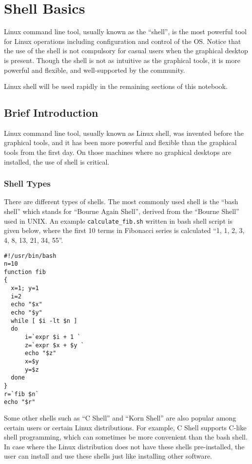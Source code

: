 \chapter{Shell Basics} \label{ch:sb}

Linux command line tool, usually known as the ``shell'', is the most powerful tool for Linux operations including configuration and control of the OS. Notice that the use of the shell is not compulsory for casual users when the graphical desktop is present. Though the shell is not as intuitive as the graphical tools, it is more powerful and flexible, and well-supported by the community.

Linux shell will be used rapidly in the remaining sections of this notebook.

\section{Brief Introduction}

Linux command line tool, usually known as Linux shell, was invented before the graphical tools, and it has been more powerful and flexible than the graphical tools from the first day. On those machines where no graphical desktops are installed, the use of shell is critical.

\subsection{Shell Types}

There are different types of shells. The most commonly used shell is the ``bash shell'' which stands for ``Bourne Again Shell'', derived from the ``Bourne Shell'' used in UNIX. An example \verb|calculate_fib.sh| written in bash shell script is given below, where the first 10 terms in Fibonacci series is calculated ``1, 1, 2, 3, 4, 8, 13, 21, 34, 55''.

\begin{lstlisting}
#!/usr/bin/bash
n=10
function fib
{
  x=1; y=1
  i=2
  echo "$x"
  echo "$y"
  while [ $i -lt $n ]
  do
      i=`expr $i + 1 `
      z=`expr $x + $y `
      echo "$z"
      x=$y
      y=$z
  done
}
r=`fib $n`
echo "$r"
\end{lstlisting}

Some other shells such as ``C Shell'' and ``Korn Shell'' are also popular among certain users or certain Linux distributions. For example, C Shell supports C-like shell programming, which can sometimes be more convenient than the bash shell. In case where the Linux distribution does not have these shells pre-installed, the user can install and use these shells just like installing other software.

